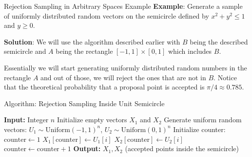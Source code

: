 \documentclass[8pt]{beamer}
\begin{document}
\begin{frame}{Rejection Sampling in Arbitrary Spaces Example}
\textbf{Example}: Generate a sample of uniformly distributed random vectors on the semicircle defined by $x^2+y^2\leq 1$ and $y\geq 0$.

\vspace{2mm}
\pause

\textbf{Solution}: We will use the algorithm described earlier with $B$ being the described semicircle and $A$ being the rectangle $[-1,1]\times [0,1]$ which includes $B$.

\vspace{2mm}

Essentially we will start generating uniformly distributed random numbers in the rectangle $A$ and out of those, we will reject the ones that are not in $B$. Notice that the theoretical probability that a proposal point is accepted is $\pi/4 \approx 0.785$. 
\end{frame}

\begin{frame}[fragile]{Algorithm: Rejection Sampling Inside Unit Semicircle}
\begin{algorithm}[H]
    \caption{Generate points $(X_1, X_2)$ uniformly inside the semicircle}
    \begin{algorithmic}[1]
        \State \textbf{Input:} Integer $n$
        \State Initialize empty vectors $X_1$ and $X_2$
        \State Generate uniform random vectors:
        \Statex \quad $U_1 \sim \text{Uniform}(-1,1)^n$, $U_2 \sim \text{Uniform}(0,1)^n$
        \State Initialize counter: $\text{counter} \gets 1$
                \State $X_1[\text{counter}] \gets U_1[i]$
                \State $X_2[\text{counter}] \gets U_2[i]$
                \State $\text{counter} \gets \text{counter} + 1$
            \EndIf
        \EndFor
        \State \textbf{Output:} $X_1, X_2$ (accepted points inside the semicircle)
    \end{algorithmic}
\end{algorithm}
\end{frame}
\end{document}
